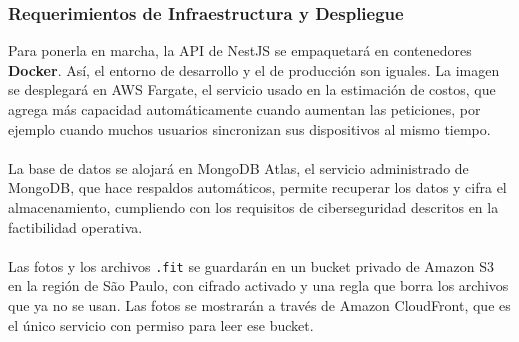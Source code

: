 \subsubsection{Requerimientos de Infraestructura y Despliegue}
Para ponerla en marcha, la API de NestJS se empaquetará en contenedores \textbf{Docker}. Así, el entorno de desarrollo y el de producción son iguales. La imagen se desplegará en AWS Fargate, el servicio usado en la estimación de costos, que agrega más capacidad automáticamente cuando aumentan las peticiones, por ejemplo cuando muchos usuarios sincronizan sus dispositivos al mismo tiempo.
\\\\
La base de datos se alojará en MongoDB Atlas, el servicio administrado de MongoDB, que hace respaldos automáticos, permite recuperar los datos y cifra el almacenamiento, cumpliendo con los requisitos de ciberseguridad descritos en la factibilidad operativa.
\\\\
Las fotos y los archivos \texttt{.fit} se guardarán en un bucket privado de Amazon S3 en la región de São Paulo, con cifrado activado y una regla que borra los archivos que ya no se usan. Las fotos se mostrarán a través de Amazon CloudFront, que es el único servicio con permiso para leer ese bucket.
